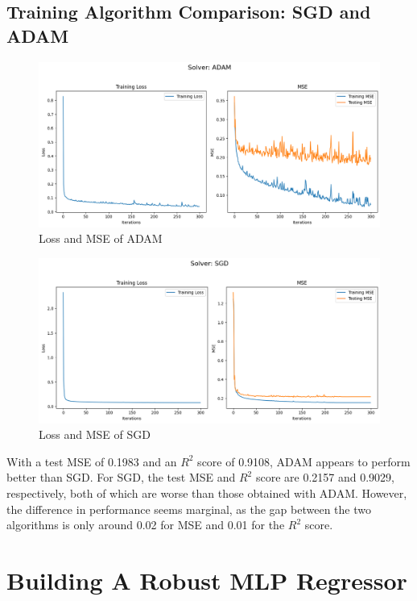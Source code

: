 \documentclass[a4paper]{article}
\begin{document}
\subsection{Training Algorithm Comparison: SGD and ADAM}
\begin{figure}[htbp]
    \centering
    \includegraphics[width=0.9\linewidth]{2.11.png}
    \caption{\centering Loss and MSE of ADAM}
\end{figure}

\begin{figure}[htbp]
    \centering
    \includegraphics[width=0.9\linewidth]{2.12.png}
    \caption{\centering Loss and MSE of SGD}
\end{figure}
With a test MSE of 0.1983 and an \( R^2 \) score of 0.9108, ADAM appears to perform better than SGD. For SGD, the test MSE and \( R^2 \) score are 0.2157 and 0.9029, respectively, both of which are worse than those obtained with ADAM. However, the difference in performance seems marginal, as the gap between the two algorithms is only around 0.02 for MSE and 0.01 for the \( R^2 \) score.



\newpage
\section{Building A Robust MLP Regressor}
\end{document}
